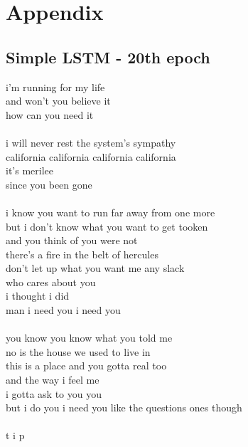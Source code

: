 \documentclass[conference]{IEEEtran}
\begin{document}



\section{Appendix}\label{APDX}

\subsection{Simple LSTM - 20th epoch}\label{LSTM20}
i'm running for my life \\
and won't you believe it \\
how can you need it \\
\\
i will never rest the system's sympathy \\
california california california california \\
it's merilee \\
since you been gone \\
\\
i know you want to run far away from one more \\
but i don't know what you want to get tooken \\
and you think of you were not \\
there's a fire in the belt of hercules \\
don't let up what you want me any slack \\
who cares about you \\
i thought i did \\
man i need you i need you \\
\\
you know you know what you told me \\
no is the house we used to live in \\
this is a place and you gotta real too \\
and the way i feel me \\
i gotta ask to you you \\
but i do you i need you like the questions ones though \\
\\
t i p \\
\end{document}

